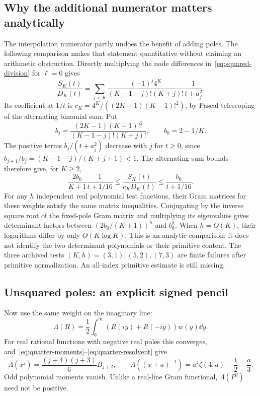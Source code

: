 \subsection{Why the additional numerator matters analytically}
The interpolation numerator partly undoes the benefit of adding poles.
The following comparison makes that statement quantitative without
claiming an arithmetic obstruction. Directly multiplying the node
differences in~\eqref{eq:squared-division} for $\ell=0$ gives
\[
 \frac{S_K(t)}{D_K(t)}=
 \sum_{j<K}\frac{(-1)^j4^K}{(K-1-j)!(K+j)!}\frac1{t+a_j^2}.
\]
Its coefficient at $1/t$ is
$c_K=4^K/((2K-1)(K-1)!^2)$, by Pascal telescoping of the
alternating binomial sum. Put
\[
 b_j=\frac{(2K-1)(K-1)!^2}{(K-1-j)!(K+j)!},\qquad b_0=2-1/K.
\]
The positive terms $b_j/(t+a_j^2)$ decrease with $j$ for $t\geq0$,
since $b_{j+1}/b_j=(K-1-j)/(K+j+1)<1$. The alternating-sum bounds
therefore give, for $K\geq2$,
\begin{equation}\label{eq:squared-comparison}
 \frac{2b_0}{K+1}\frac1{t+1/16}
 \leq\frac{S_K(t)}{c_KD_K(t)}
 \leq\frac{b_0}{t+1/16}.
\end{equation}
For any $h$ independent real polynomial test functions, their Gram
matrices for these weights satisfy the same matrix inequalities.
Conjugating by the inverse square root of the fixed-pole Gram matrix
and multiplying its eigenvalues gives determinant factors between
$(2b_0/(K+1))^h$ and $b_0^h$.
When $h=O(K)$, their logarithms differ by only $O(K\log K)$.
This is an analytic comparison; it does not identify the two determinant
polynomials or their primitive content. The three archived tests
$(K,h)=(3,1),(5,2),(7,3)$ are finite failures after primitive normalization.
An all-index primitive estimate is still missing.

\subsection{Unsquared poles: an explicit signed pencil}
Now use the same weight on the imaginary line:
\[
 \Lambda(R)=\frac12\int_0^\infty(R(iy)+R(-iy))w(y)\dd y.
\]
For real rational functions with negative real poles this converges,
and~\eqref{eq:quarter-moments}--\eqref{eq:quarter-resolvent} give
\begin{equation}\label{eq:lambda-poles}
 \Lambda(x^j)=\frac{(j+4)(j+3)}6 B_{j+2},\qquad
 \Lambda((x+a)^{-1})=a^4\zeta(4,a)-\frac12-\frac a3.
\end{equation}
Odd polynomial moments vanish. Unlike a real-line Gram functional,
$\Lambda(P^2)$ need not be positive.

